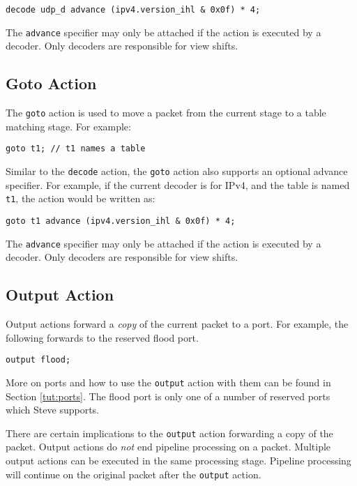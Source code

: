 \begin{lstlisting}
decode udp_d advance (ipv4.version_ihl & 0x0f) * 4;
\end{lstlisting}

The \texttt{advance} specifier may only be attached if the action is executed by a
decoder. Only decoders are responsible for view shifts.

\subsection{Goto Action} \label{tut:goto_action}

The \texttt{goto} action is used to move a packet from the current stage to a
table matching stage. For example:

\begin{lstlisting}
goto t1; // t1 names a table
\end{lstlisting}

Similar to the \texttt{decode} action, the \texttt{goto} action also supports an
optional advance specifier. For example, if the current decoder is for IPv4, and
the table is named \texttt{t1}, the action would be written as:

\begin{lstlisting}
goto t1 advance (ipv4.version_ihl & 0x0f) * 4;
\end{lstlisting}

The \texttt{advance} specifier may only be attached if the action is executed by a
decoder. Only decoders are responsible for view shifts.

\subsection{Output Action} \label{tut:output_action}

Output actions forward a \textit{copy} of the current packet to a port. 
For example, the following forwards to the reserved flood port. 

\begin{lstlisting}
output flood;
\end{lstlisting}

More on ports and how to use the \texttt{output} action with them can
be found in Section \ref{tut:ports}. The flood port is only one
of a number of reserved ports which Steve supports.

There are certain implications to the \texttt{output} action forwarding a copy of the packet. 
Output actions do \emph{not} end pipeline processing on a packet.
Multiple output actions can be executed in the same processing stage. 
Pipeline processing will continue
on the original packet after the \texttt{output} action.


